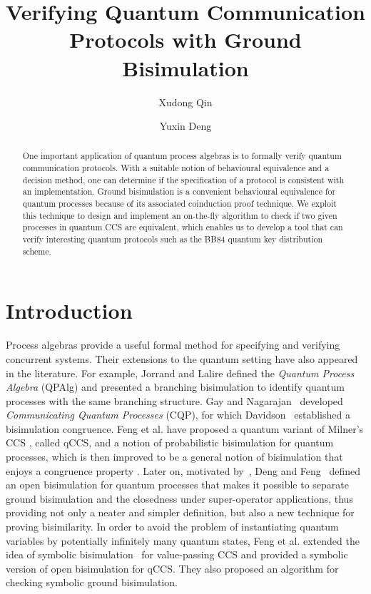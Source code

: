 \documentclass[a4paper,UKenglish,cleveref, autoref]{lipics-v2019}
\title{Verifying Quantum Communication Protocols with Ground Bisimulation}
\author{Xudong Qin}{Shanghai Key Laboratory of Trustworthy Computing, East China Normal University, China}{steven$\_$qxd@126.com}{}{}
\author{Yuxin Deng}{Shanghai Key Laboratory of Trustworthy Computing, East China Normal University, China}{yxdeng@sei.ecnu.edu.cn}{}{}
\begin{document}
\maketitle

\begin{abstract}
	
One important application of quantum process algebras is to formally verify quantum communication protocols. With a suitable notion of behavioural equivalence and a decision method, one can determine if the specification of a protocol is consistent with an implementation. Ground bisimulation is a convenient behavioural equivalence for quantum processes because of its associated coinduction proof technique. We exploit this technique to design and implement an on-the-fly algorithm to check if two given processes in quantum CCS are equivalent, which enables us to develop a tool that can verify interesting quantum protocols such as the BB84 quantum key distribution scheme.
\end{abstract}

\section{Introduction}
\label{sec:introduction}
Process algebras provide a useful formal method for specifying and verifying concurrent systems. Their extensions to the quantum setting have also appeared in the literature. For example, Jorrand and Lalire \cite{JL04,La06} defined the \emph{Quantum Process Algebra} (QPAlg) and presented a branching bisimulation to identify quantum processes with the same branching structure. Gay and Nagarajan~\cite{GN05}  developed \emph{Communicating Quantum Processes} (CQP), for which Davidson~\cite{Da11} established a bisimulation congruence.
Feng et al. \cite{FDJY07} have proposed a quantum variant of  Milner's CCS \cite{ccs}, called qCCS, and a notion of probabilistic bisimulation for quantum processes, which is then improved to be a general notion of bisimulation that enjoys a congruence property \cite{FDY11}. Later on, motivated by~\cite{San96}, Deng and Feng~\cite{DF12} defined an open bisimulation for quantum processes that makes it possible to separate ground bisimulation and the closedness under super-operator applications, thus providing not only a neater and simpler definition, but also a new technique for proving bisimilarity.
In order to avoid the problem of instantiating quantum variables by potentially infinitely many quantum states, Feng et al. \cite{FDY14} extended the idea of symbolic bisimulation~\cite{HL95} for value-passing CCS and provided a 
 symbolic version of open bisimulation for qCCS. They also proposed an algorithm for checking symbolic ground bisimulation.
 
\end{document}
